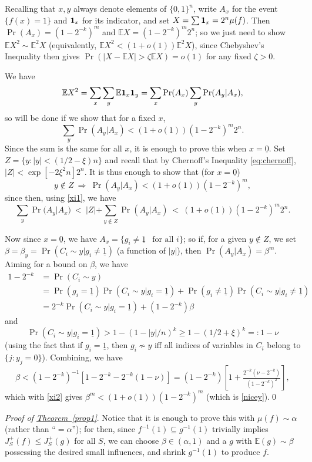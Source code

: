 \documentclass[11pt]{article}
\numberwithin{equation}{section}
\theoremstyle{definition}
\theoremstyle{plain}
\newcommand{\expref}[2]{\hyperref[#2]{#1~\ref{#2}}}
\newcommand{\one}[0]{{\bf 1}}
\newcommand{\uzero}[0]{\underline{0}}
\newcommand{\uone}[0]{\underline{1}}
\newcommand{\beq}[1]{\begin{equation}\label{#1}}
\newcommand{\enq}[0]{\end{equation}}
\newcommand{\mn}[0]{\medskip\noindent}
\newcommand{\sub}[0]{\subseteq}
\newcommand{\Ra}[0]{\Rightarrow}
\newcommand{\0}[0]{\emptyset}
\newcommand{\ga}[0]{\alpha }
\newcommand{\gb}[0]{\beta }
\newcommand{\gz}[0]{\zeta}
\begin{document}
Recalling that $x,y$ always denote elements of $\{0,1\}^n$,
write $A_x$ for the event $\{f(x)=1\}$ and $\one_x$
for its indicator,
and set $X=\sum \one_x=2^n\mu(f) $.
Then
$\Pr(A_x)= (1-2^{-k})^m$ and
$\mathbb E  X = (1-2^{-k})^m2^n$; so we just need to show
$
\mathbb E  X^2\sim \mathbb E ^2 X
$ 
(equivalently, $\mathbb E  X^2<(1+o(1))\mathbb E ^2 X$),
since Chebyshev's Inequality then gives
$\Pr(|X-\mathbb E  X|> \gz\mathbb E  X) =o(1)$
for any fixed $\gz>0$.


We have
$$
\mathbb E  X^2 = \sum_x\sum_y\mathbb E  \one_x\one_y =\sum_x\Pr(A_x)\sum_y\Pr(A_y|A_x),
$$
so will be done if we show that for a fixed $x$,
$$ 
\sum_y\Pr(A_y|A_x) <(1+o(1)) (1-2^{-k})^m2^n.
$$ 
Since the sum is the same for all $x$, it is enough %
to prove this when $x=\uzero$.
Set $Z=\{y:|y|<(1/2-\xi)n\}$ and recall 
%
that by Chernoff's Inequality \eqref{eq:chernoff}, 
%
%
%
%
$|Z|<\exp[-2\xi^2n]2^n$.
It is thus enough to show that (for $x=\uzero$)
\beq{nicey}
y\not\in Z ~\Ra~\Pr(A_y|A_x)<(1+o(1)) (1-2^{-k})^m,
\enq
since then, using \eqref{xi1}, we have
$$
\sum_y\Pr(A_y|A_x) ~<~ |Z| + \sum_{y\not\in Z}\Pr(A_y|A_x)
~<~ (1+o(1)) (1-2^{-k})^m2^n.
$$


Now since $x=\uzero$, we have
%
$A_x =\{g_i\neq \uone ~~ \text{ for all } i\}$; %
%
%
so 
if, for a given $y\not\in Z$, we set
$\gb =\gb_y=\Pr(C_i\sim y|g_i\neq \uone)$
(a function of $|y|$),
then $\Pr(A_y|A_x) = \gb^m$.
Aiming for a bound on $\gb$, we have
%
\begin{align*}
1-2^{-k}&=\Pr(C_i\sim y) \\
&=
\Pr(g_i=\uone)\Pr(C_i\sim y|g_i=\uone)
+ \Pr(g_i\neq\uone)\Pr(C_i\sim y|g_i\neq \uone)\\
&= 2^{-k}\Pr(C_i\sim y|g_i=\uone) +(1-2^{-k})\gb
\end{align*}
and
$$\Pr(C_i\sim y|g_i=\uone) > 1 - (1-|y|/n)^k
\geq 1-(1/2+\xi)^k=:1-\nu
$$
(using the fact that if
$g_i=\uone$, then $g_i\not\sim y$
iff all indices of
variables in $C_i$ belong to $\{j:y_j=0\}$).
Combining, we have
$$
\gb < (1-2^{-k})^{-1}[1-2^{-k} - 2^{-k}(1-\nu)]
=(1-2^{-k})\left[1+\tfrac{2^{-k}(\nu -2^{-k})}{(1-2^{-k})^2}\right],
$$
which with \eqref{xi2} gives
$\gb^m < (1+o(1))(1-2^{-k})^m$ (which is \eqref{nicey}).\qed

\mn
\emph{Proof of \expref{Theorem}{prop1}}.    %
Notice that it is %
enough to prove this with $\mu(f) \sim \ga$
(rather than ``$=\ga$'');
for then,
since $f^{-1}(1)\sub g^{-1}(1)$ trivially implies
$J_S^+(f)\leq J_S^+(g)$ for all $S$, we can
choose
$\gb\in (\ga,1)$ and a $g$ with $\mathbb E (g)\sim \gb$
possessing the desired small influences, and
shrink $g^{-1}(1)$ to produce $f$.
\end{document}
